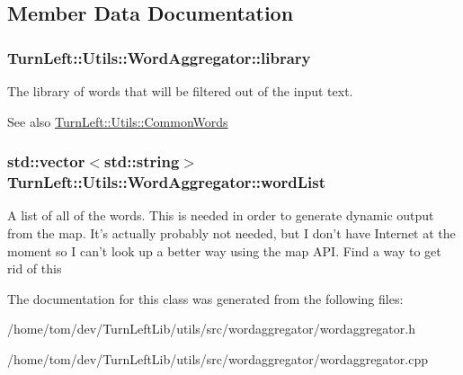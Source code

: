 \subsection{Member Data Documentation}
\hypertarget{classTurnLeft_1_1Utils_1_1WordAggregator_a51f9ddd22dab31dc20cb6c80cdd5711f}{
\subsubsection[{library}]{ {\bf TurnLeft::Utils::WordAggregator::library}}}
\label{classTurnLeft_1_1Utils_1_1WordAggregator_a51f9ddd22dab31dc20cb6c80cdd5711f}
The library of words that will be filtered out of the input text. \begin{DoxySeeAlso}{See also}
\hyperlink{classTurnLeft_1_1Utils_1_1CommonWords}{TurnLeft::Utils::CommonWords} 
\end{DoxySeeAlso}
\hypertarget{classTurnLeft_1_1Utils_1_1WordAggregator_a98ee20472e3bf576f23e3b525ab317fc}{
\subsubsection[{wordList}]{\setlength{\rightskip}{0pt plus 5cm}std::vector$<$std::string$>$ {\bf TurnLeft::Utils::WordAggregator::wordList}}}
\label{classTurnLeft_1_1Utils_1_1WordAggregator_a98ee20472e3bf576f23e3b525ab317fc}
A list of all of the words. This is needed in order to generate dynamic output from the map. It's actually probably not needed, but I don't have Internet at the moment so I can't look up a better way using the map API.  Find a way to get rid of this 

The documentation for this class was generated from the following files:\begin{DoxyCompactItemize}
\item 
/home/tom/dev/TurnLeftLib/utils/src/wordaggregator/wordaggregator.h\item 
/home/tom/dev/TurnLeftLib/utils/src/wordaggregator/wordaggregator.cpp\end{DoxyCompactItemize}
